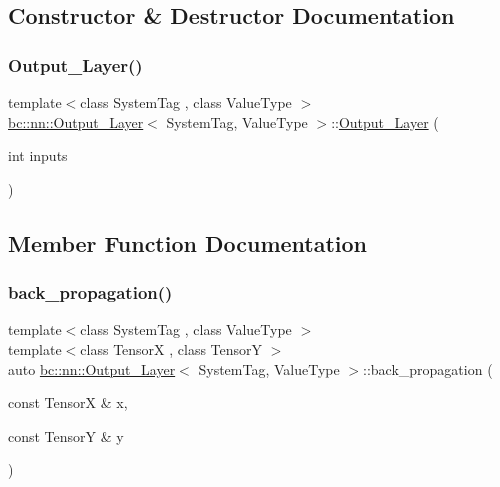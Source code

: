 \subsection{Constructor \& Destructor Documentation}
\mbox{\label{structbc_1_1nn_1_1Output__Layer_af2ea2ff4ed24a9ec365c80728b9eb0e0}} 
\subsubsection{\texorpdfstring{Output\+\_\+\+Layer()}{Output\_Layer()}}
{\footnotesize\ttfamily template$<$class System\+Tag , class Value\+Type $>$ \\
\hyperlink{structbc_1_1nn_1_1Output__Layer}{bc\+::nn\+::\+Output\+\_\+\+Layer}$<$ System\+Tag, Value\+Type $>$\+::\hyperlink{structbc_1_1nn_1_1Output__Layer}{Output\+\_\+\+Layer} (\begin{DoxyParamCaption}\item[{int}]{inputs }\end{DoxyParamCaption})\hspace{0.3cm}{\ttfamily [inline]}}



\subsection{Member Function Documentation}
\mbox{\label{structbc_1_1nn_1_1Output__Layer_ae17199c4928823b57fea1f9549dc9c9b}} 
\subsubsection{\texorpdfstring{back\+\_\+propagation()}{back\_propagation()}}
{\footnotesize\ttfamily template$<$class System\+Tag , class Value\+Type $>$ \\
template$<$class TensorX , class TensorY $>$ \\
auto \hyperlink{structbc_1_1nn_1_1Output__Layer}{bc\+::nn\+::\+Output\+\_\+\+Layer}$<$ System\+Tag, Value\+Type $>$\+::back\+\_\+propagation (\begin{DoxyParamCaption}\item[{const TensorX \&}]{x,  }\item[{const TensorY \&}]{y }\end{DoxyParamCaption})\hspace{0.3cm}{\ttfamily [inline]}}

